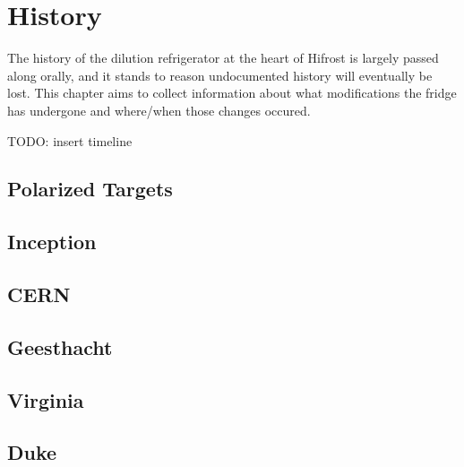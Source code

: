 \chapter{History} 
\label{history} 
The history of the dilution refrigerator at the heart of Hifrost is largely passed along orally, and it stands to reason undocumented history will eventually be lost.  This chapter aims to collect information about what modifications the fridge has undergone and where/when those changes occured. 



TODO: insert timeline 
\section{Polarized Targets}

\section{Inception}  
 
\section{CERN} 
 
\section{Geesthacht} 

\section{Virginia}

\section{Duke}
